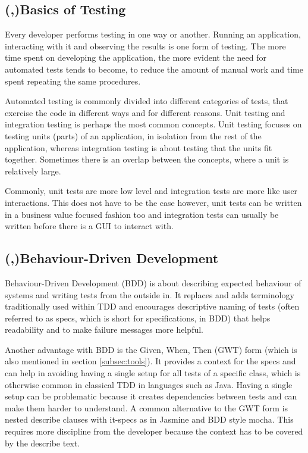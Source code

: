 \documentclass[11pt]{article}
\begin{document}
\subsection{(,)Basics of Testing}

Every developer performs testing in one way or another. Running an application, interacting with it and observing the results is one form of testing. The more time spent on developing the application, the more evident the need for automated tests tends to become, to reduce the amount of manual work and time spent repeating the same procedures.

Automated testing is commonly divided into different categories of tests, that exercise the code in different ways and for different reasons. Unit testing and integration testing is perhaps the most common concepts. Unit testing focuses on testing units (parts) of an application, in isolation from the rest of the application, whereas integration testing is about testing that the units fit together. Sometimes there is an overlap between the concepts, where a unit is relatively large.

Commonly, unit tests are more low level and integration tests are more like user interactions. This does not have to be the case however, unit tests can be written in a business value focused fashion too and integration tests can usually be written before there is a GUI to interact with. \cite[question~20]{Ahnve}

\subsection{(,)Behaviour-Driven Development}

Behaviour-Driven Development (BDD) is about describing expected behaviour of systems and writing tests from the outside in. It replaces and adds terminology traditionally used within TDD and encourages descriptive naming of tests (often referred to as specs, which is short for specifications, in BDD) that helps readability and to make failure messages more helpful. \cite[questions~17-18]{Ahnve}

Another advantage with BDD is the Given, When, Then (GWT) form (which is also mentioned in section \ref{subsec:tools}). It provides a context for the specs and can help in avoiding having a single setup for all tests of a specific class, which is otherwise common in classical TDD in languages such as Java. Having a single setup can be problematic because it creates dependencies between tests and can make them harder to understand. A common alternative to the GWT form is nested describe clauses with it-specs as in Jasmine and BDD style mocha. This requires more discipline from the developer because the context has to be covered by the describe text. \cite[question~19]{Ahnve}
\end{document}
